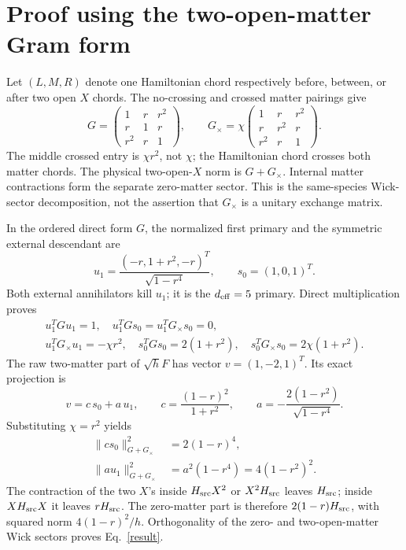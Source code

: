 \documentclass[11pt,a4paper]{article}
\newcommand{\norm}[1]{\lVert#1\rVert}
\begin{document}
\newpage
\section{Proof using the two-open-matter Gram form}
Let $(L,M,R)$ denote one Hamiltonian chord respectively before, between,
or after two open $X$ chords. The no-crossing and crossed matter
pairings give
\begin{equation}
 G=\begin{pmatrix}1&r&r^2\\r&1&r\\r^2&r&1\end{pmatrix},\qquad
 G_\times=\chi\begin{pmatrix}1&r&r^2\\r&r^2&r\\r^2&r&1\end{pmatrix}.
 \label{gram}
\end{equation}
The middle crossed entry is $\chi r^2$, not $\chi$; the Hamiltonian
chord crosses both matter chords. The physical two-open-$X$ norm is
$G+G_\times$. Internal matter contractions form the separate
zero-matter sector. This is the same-species Wick-sector decomposition,
not the assertion that $G_\times$ is a unitary exchange matrix.

In the ordered direct form $G$, the normalized first primary and the
symmetric external descendant are
\begin{equation}
 u_1=\frac{(-r,1+r^2,-r)^T}{\sqrt{1-r^4}},\qquad
 s_0=(1,0,1)^T.
\end{equation}
Both external annihilators kill $u_1$; it is the $d_{\rm eff}=5$
primary. Direct multiplication proves
\begin{gather}
 u_1^TGu_1=1,\quad u_1^TG s_0=u_1^TG_\times s_0=0,\nonumber\\
 u_1^TG_\times u_1=-\chi r^2,\quad
 s_0^TG s_0=2(1+r^2),\quad s_0^TG_\times s_0=2\chi(1+r^2).
\end{gather}
The raw two-matter part of $\sqrt hF$ has vector $v=(1,-2,1)^T$.
Its exact projection is
\begin{equation}
 v=c\,s_0+a\,u_1,\qquad
 c=\frac{(1-r)^2}{1+r^2},\qquad
 a=-\frac{2(1-r^2)}{\sqrt{1-r^4}}.\label{project}
\end{equation}
Substituting $\chi=r^2$ yields
\begin{align}
 \norm{c s_0}_{G+G_\times}^2&=2(1-r)^4,\nonumber\\
 \norm{a u_1}_{G+G_\times}^2&=a^2(1-r^4)=4(1-r^2)^2.
\end{align}
The contraction of the two $X$'s inside $H_{\rm src}X^2$ or
$X^2H_{\rm src}$ leaves $H_{\rm src}$; inside $XH_{\rm src}X$
it leaves $rH_{\rm src}$. The zero-matter part is therefore
$2(1-r)H_{\rm src}$, with squared norm $4(1-r)^2/h$.
Orthogonality of the zero- and two-open-matter Wick sectors proves
Eq.~\eqref{result}.
\end{document}
